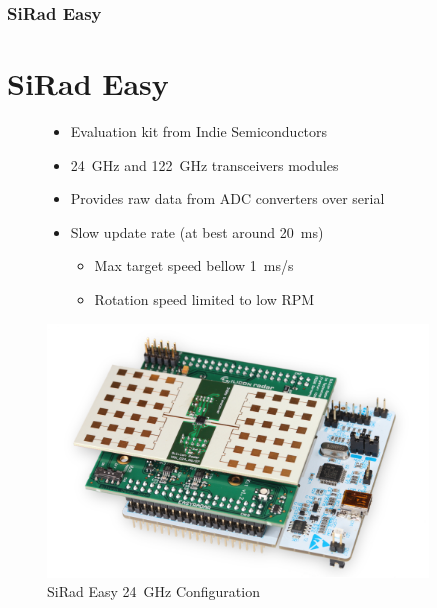 \documentclass[aspectratio=169]{beamer}
\begin{document}
\begin{frame}[fragile]
  \frametitle{SiRad Easy}
  \section{SiRad Easy}
  \begin{figure}[!htb]
    \begin{minipage}{0.48\textwidth}
      \begin{itemize}
        \item Evaluation kit from Indie Semiconductors
        \item 24~GHz and 122~GHz transceivers modules
				\item Provides raw data from ADC converters over serial
        \item Slow update rate (at best around 20~ms)
          \begin{itemize}
            \item Max target speed bellow 1~ms/s
            \item Rotation speed limited to low RPM
          \end{itemize}
      \end{itemize}
    \end{minipage}\hfill
    \begin{minipage}{0.48\textwidth}
      \centering
      \includegraphics[width=0.9\textwidth]{../img/sirad.png}

      \caption{SiRad Easy 24~GHz Configuration}
    \end{minipage}
  \end{figure}
\end{frame}
\end{document}
